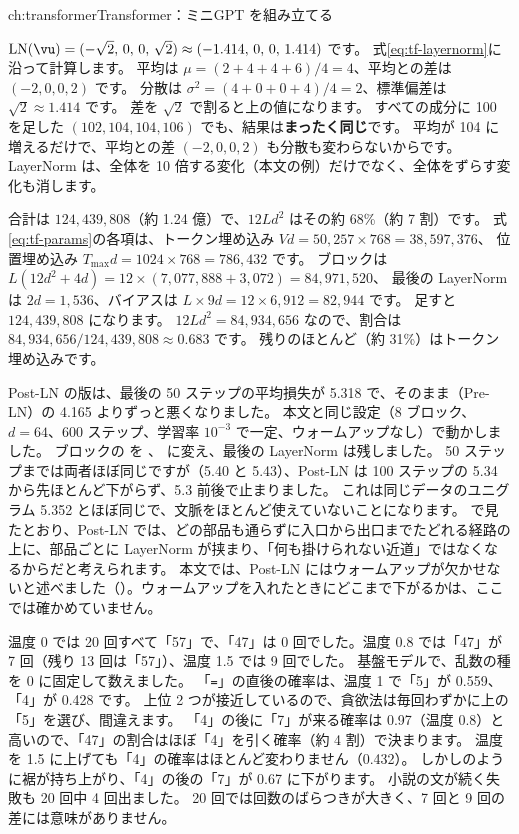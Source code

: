 \begin{answers}{ch:transformer}{Transformer：ミニGPT を組み立てる}
\item $\mathrm{LN}(\vu)=(-\sqrt2,\,0,\,0,\,\sqrt2)\approx(-1.414,\,0,\,0,\,1.414)$ です。
式\eqref{eq:tf-layernorm}に沿って計算します。
平均は $\mu=(2+4+4+6)/4=4$、平均との差は $(-2,0,0,2)$ です。
分散は $\sigma^2=(4+0+0+4)/4=2$、標準偏差は $\sqrt2\approx1.414$ です。
差を $\sqrt2$ で割ると上の値になります。
すべての成分に 100 を足した $(102,104,104,106)$ でも、結果は\textbf{まったく同じ}です。
平均が 104 に増えるだけで、平均との差 $(-2,0,0,2)$ も分散も変わらないからです。
LayerNorm は、全体を 10 倍する変化（本文の例）だけでなく、全体をずらす変化も消します。

\item 合計は $124{,}439{,}808$（約 1.24 億）で、$12Ld^2$ はその約 68\%（約 7 割）です。
式\eqref{eq:tf-params}の各項は、トークン埋め込み $Vd=50{,}257\times768=38{,}597{,}376$、
位置埋め込み $T_{\max}d=1024\times768=786{,}432$ です。
ブロックは $L(12d^2+4d)=12\times(7{,}077{,}888+3{,}072)=84{,}971{,}520$、
最後の LayerNorm は $2d=1{,}536$、バイアスは $L\times 9d=12\times6{,}912=82{,}944$ です。
足すと $124{,}439{,}808$ になります。
$12Ld^2=84{,}934{,}656$ なので、割合は $84{,}934{,}656/124{,}439{,}808\approx0.683$ です。
残りのほとんど（約 31\%）はトークン埋め込みです。

\item Post-LN の版は、最後の 50 ステップの平均損失が 5.318 で、そのまま（Pre-LN）の 4.165 よりずっと悪くなりました。
本文と同じ設定（8 ブロック、$d=64$、600 ステップ、学習率 $10^{-3}$ で一定、ウォームアップなし）で動かしました。
ブロックの  を 、 に変え、最後の LayerNorm は残しました。
50 ステップまでは両者ほぼ同じですが（5.40 と 5.43）、Post-LN は 100 ステップの 5.34 から先ほとんど下がらず、5.3 前後で止まりました。
これは同じデータのユニグラム 5.352 とほぼ同じで、文脈をほとんど使えていないことになります。
で見たとおり、Post-LN では、どの部品も通らずに入口から出口までたどれる経路の上に、部品ごとに LayerNorm が挟まり、「何も掛けられない近道」ではなくなるからだと考えられます。
本文では、Post-LN にはウォームアップが欠かせないと述べました（）。ウォームアップを入れたときにどこまで下がるかは、ここでは確かめていません。
\item 温度 0 では 20 回すべて「57」で、「47」は 0 回でした。温度 0.8 では「47」が 7 回（残り 13 回は「57」）、温度 1.5 では 9 回でした。
基盤モデルで、乱数の種を 0 に固定して数えました。
「\texttt{=}」の直後の確率は、温度 1 で「5」が 0.559、「4」が 0.428 です。
上位 2 つが接近しているので、貪欲法は毎回わずかに上の「5」を選び、間違えます。
「4」の後に「7」が来る確率は 0.97（温度 0.8）と高いので、「47」の割合はほぼ「4」を引く確率（約 4 割）で決まります。
温度を 1.5 に上げても「4」の確率はほとんど変わりません（0.432）。
しかしのように裾が持ち上がり、「4」の後の「7」が 0.67 に下がります。
小説の文が続く失敗も 20 回中 4 回出ました。
20 回では回数のばらつきが大きく、7 回と 9 回の差には意味がありません。


\end{answers}
